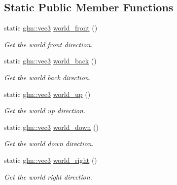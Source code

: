 \subsection*{Static Public Member Functions}
\begin{DoxyCompactItemize}
\item 
static \mbox{\hyperlink{namespacemoka_aed2224bc0e5b79e57a8975ded94ee1aaa97ade28e93c0de60adc075bdbe07ca36}{glm\+::vec3}} \mbox{\hyperlink{classmoka_1_1transform_a4212585d4bde3be8fcf6d80122d8514d}{world\+\_\+front}} ()
\begin{DoxyCompactList}\small\item\em Get the world front direction. \end{DoxyCompactList}\item 
static \mbox{\hyperlink{namespacemoka_aed2224bc0e5b79e57a8975ded94ee1aaa97ade28e93c0de60adc075bdbe07ca36}{glm\+::vec3}} \mbox{\hyperlink{classmoka_1_1transform_a661f13baaf1d034140bee8c053e54d2d}{world\+\_\+back}} ()
\begin{DoxyCompactList}\small\item\em Get the world back direction. \end{DoxyCompactList}\item 
static \mbox{\hyperlink{namespacemoka_aed2224bc0e5b79e57a8975ded94ee1aaa97ade28e93c0de60adc075bdbe07ca36}{glm\+::vec3}} \mbox{\hyperlink{classmoka_1_1transform_afb4410934686c722f0215a06a7984d61}{world\+\_\+up}} ()
\begin{DoxyCompactList}\small\item\em Get the world up direction. \end{DoxyCompactList}\item 
static \mbox{\hyperlink{namespacemoka_aed2224bc0e5b79e57a8975ded94ee1aaa97ade28e93c0de60adc075bdbe07ca36}{glm\+::vec3}} \mbox{\hyperlink{classmoka_1_1transform_acf33dea012bcc221745c459be7060436}{world\+\_\+down}} ()
\begin{DoxyCompactList}\small\item\em Get the world down direction. \end{DoxyCompactList}\item 
static \mbox{\hyperlink{namespacemoka_aed2224bc0e5b79e57a8975ded94ee1aaa97ade28e93c0de60adc075bdbe07ca36}{glm\+::vec3}} \mbox{\hyperlink{classmoka_1_1transform_a8f3d35d28a475aa3e232825cb335b6e1}{world\+\_\+right}} ()
\begin{DoxyCompactList}\small\item\em Get the world right direction. \end{DoxyCompactList}\item 

\end{DoxyCompactItemize}
